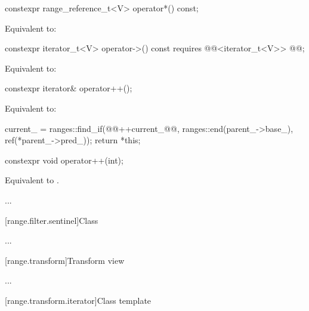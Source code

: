 \documentclass{wg21}
\begin{document}
%
\begin{itemdecl}
constexpr range_reference_t<V> operator*() const;
\end{itemdecl}

\begin{itemdescr}
\pnum
\effects Equivalent to: 
\end{itemdescr}

%
\begin{itemdecl}
	constexpr iterator_t<V> operator->() const
	requires @@<iterator_t<V>> @@;
\end{itemdecl}

\begin{itemdescr}
	\pnum
	\effects
	Equivalent to: 
\end{itemdescr}

%
\begin{itemdecl}
	constexpr iterator& operator++();
\end{itemdecl}

\begin{itemdescr}
\pnum
\effects
Equivalent to:
\begin{codeblock}
   current_ = ranges::find_if(@@++current_@\added{)}@,
        ranges::end(parent_->base_), ref(*parent_->pred_));
   return *this;
\end{codeblock}
\end{itemdescr}

%
\begin{itemdecl}
	constexpr void operator++(int);
\end{itemdecl}

\begin{itemdescr}
	\pnum
	\effects
	Equivalent to .
\end{itemdescr}

...

[range.filter.sentinel]{Class }

...


[range.transform]{Transform view}

...

[range.transform.iterator]{Class template }
\end{document}
